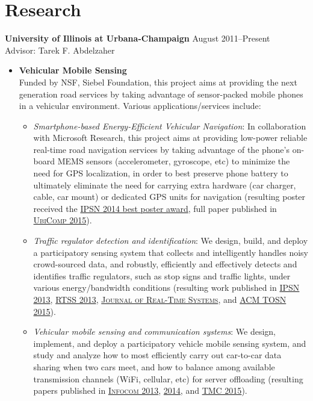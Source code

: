 
\section{\sc Research} {\bf University of Illinois at Urbana-Champaign} \hfill August 2011--Present\\
Advisor: Tarek F. Abdelzaher
\begin{itemize}
\item \textbf{Vehicular Mobile Sensing}\\
Funded by NSF, Siebel Foundation, this project aims at providing the next generation road services by taking advantage of sensor-packed mobile phones in a vehicular environment. Various applications/services include:
\begin{itemize}

\item {\em Smartphone-based Energy-Efficient Vehicular Navigation}: In collaboration with Microsoft Research, this project aims at providing low-power reliable real-time road navigation services by taking advantage of the phone's on-board MEMS sensors (accelerometer, gyroscope, etc) to minimize the need for GPS localization, in order to best preserve phone battery to ultimately eliminate the need for carrying extra hardware (car charger, cable, car mount) or dedicated GPS units for navigation (resulting poster received the \hyperlink{hu2014ipsn}{IPSN 2014 best poster award}, full paper published in \hyperlink{hu2015ubicomp}{\textsc{UbiComp 2015}}).

\item {\em Traffic regulator detection and identification}: We design, build, and deploy a participatory sensing system that collects and intelligently handles noisy crowd-sourced data, and robustly, efficiently and effectively detects and identifies traffic regulators, such as stop signs and traffic lights, under various energy/bandwidth conditions (resulting work published in \hyperlink{hu2013ipsn}{\textsc{IPSN 2013}}, \hyperlink{wang2013rtss}{\textsc{RTSS 2013}}, \hyperlink{wang2015jrts}{\textsc{Journal of Real-Time Systems}}, and \hyperlink{hu2015tosn}{\textsc{ACM TOSN 2015}}).

\item {\em Vehicular mobile sensing and communication systems}: We design, implement, and deploy a participatory vehicle mobile sensing system, and study and analyze how to most efficiently carry out car-to-car data sharing when two cars meet, and how to balance among available transmission channels (WiFi, cellular, etc) for server offloading (resulting papers published in \hyperlink{liu2013infocom}{\textsc{Infocom 2013}}, \hyperlink{hu2014infocom}{\textsc{2014}}, and \hyperlink{hu2015tmc}{\textsc{TMC 2015}}).


\end{itemize}
\end{itemize}

